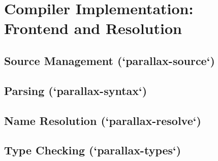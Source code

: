 \section{Compiler Implementation: Frontend and Resolution}

\subsection{Source Management (`parallax-source`)}

\subsection{Parsing (`parallax-syntax`)}

\subsection{Name Resolution (`parallax-resolve`)}

\subsection{Type Checking (`parallax-types`)}

